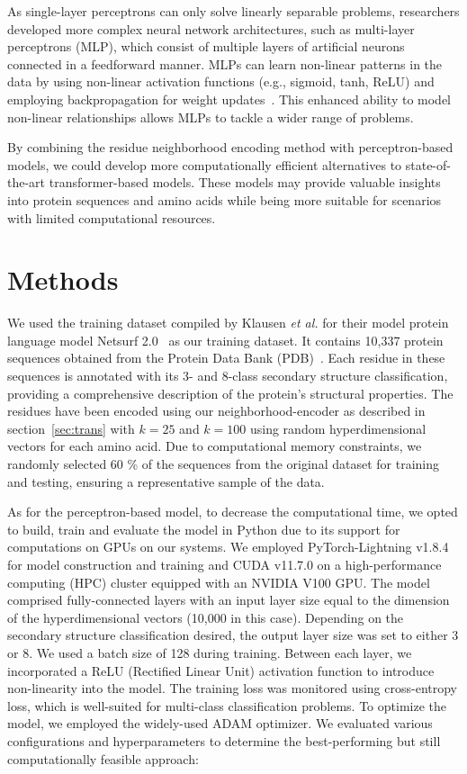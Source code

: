 As single-layer perceptrons can only solve linearly separable problems, researchers developed more complex neural network architectures, such as multi-layer perceptrons (MLP), which consist of multiple layers of artificial neurons connected in a feedforward manner. MLPs can learn non-linear patterns in the data by using non-linear activation functions (e.g., sigmoid, tanh, ReLU) and employing backpropagation for weight updates~\cite{mlp}. This enhanced ability to model non-linear relationships allows MLPs to tackle a wider range of problems.

By combining the residue neighborhood encoding method with perceptron-based models, we could develop more computationally efficient alternatives to state-of-the-art transformer-based models. These models may provide valuable insights into protein sequences and amino acids while being more suitable for scenarios with limited computational resources.

\section{Methods}
We used the training dataset compiled by Klausen \textit{et al.} for their model protein language model Netsurf 2.0~\cite{netsurf} as our training dataset. It contains 10,337 protein sequences obtained from the Protein Data Bank (PDB)~\cite{pdb}. Each residue in these sequences is annotated with its 3- and 8-class secondary structure classification, providing a comprehensive description of the protein's structural properties. The residues have been encoded using our neighborhood-encoder as described in section~\ref{sec:trans} with $k=25$ and $k=100$ using random hyperdimensional vectors for each amino acid. Due to computational memory constraints, we randomly selected 60 \% of the sequences from the original dataset for training and testing, ensuring a representative sample of the data.

As for the perceptron-based model, to decrease the computational time, we opted to build, train and evaluate the model in Python due to its support for computations on GPUs on our systems. We employed PyTorch-Lightning v1.8.4 for model construction and training and CUDA v11.7.0 on a high-performance computing (HPC) cluster equipped with an NVIDIA V100 GPU. The model comprised fully-connected layers with an input layer size equal to the dimension of the hyperdimensional vectors (10,000 in this case). Depending on the secondary structure classification desired, the output layer size was set to either 3 or 8. We used a batch size of 128 during training. Between each layer, we incorporated a ReLU (Rectified Linear Unit) activation function to introduce non-linearity into the model. The training loss was monitored using cross-entropy loss, which is well-suited for multi-class classification problems. To optimize the model, we employed the widely-used ADAM optimizer. We evaluated various configurations and hyperparameters to determine the best-performing but still computationally feasible approach:

